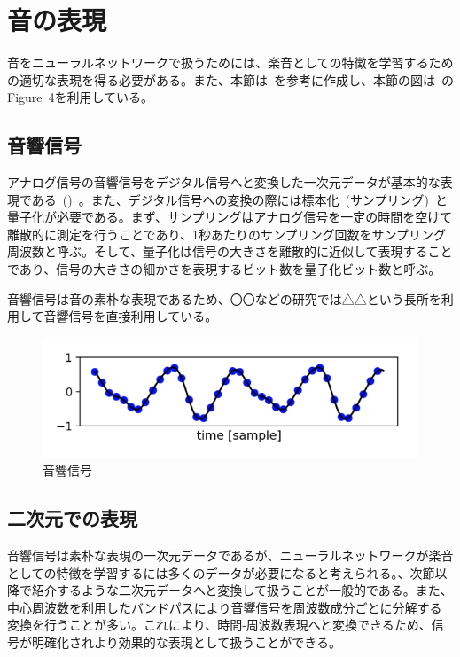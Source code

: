 \clearpage

\section{音の表現}
\label{sec:preprocess}

音をニューラルネットワークで扱うためには、楽音としての特徴を学習するための適切な表現を得る必要がある。また、本節は~\cite{musictutorial}を参考に作成し、本節の図は~\cite{musictutorial}のFigure~4を利用している。

\subsection{音響信号}

アナログ信号の音響信号をデジタル信号へと変換した一次元データが基本的な表現である~()~。また、デジタル信号への変換の際には標本化~(サンプリング)~と量子化が必要である。まず、サンプリングはアナログ信号を一定の時間を空けて離散的に測定を行うことであり、1秒あたりのサンプリング回数をサンプリング周波数と呼ぶ。そして、量子化は信号の大きさを離散的に近似して表現することであり、信号の大きさの細かさを表現するビット数を量子化ビット数と呼ぶ。

音響信号は音の素朴な表現であるため、〇〇などの研究では△△という長所を利用して音響信号を直接利用している。

\begin{figure}[b]
\centering
\includegraphics[width=0.8\columnwidth]{figure/audio_signal.png}
\caption{音響信号}
\label{fig:audio_signal}
\end{figure}

\subsection{二次元での表現}

音響信号は素朴な表現の一次元データであるが、ニューラルネットワークが楽音としての特徴を学習するには多くのデータが必要になると考えられる。、次節以降で紹介するような二次元データへと変換して扱うことが一般的である。また、中心周波数を利用したバンドパスにより音響信号を周波数成分ごとに分解する変換を行うことが多い。これにより、時間-周波数表現へと変換できるため、信号が明確化されより効果的な表現として扱うことができる。

